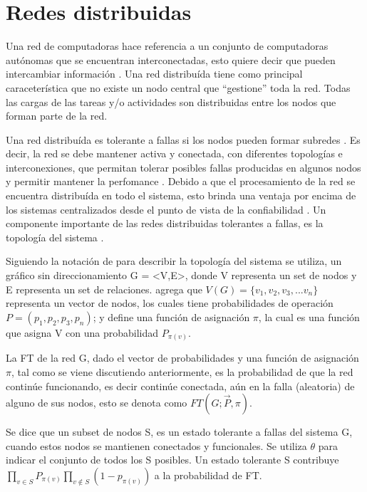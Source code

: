 \section{Redes distribuidas}
Una red de computadoras hace referencia a un conjunto de computadoras autónomas que se encuentran interconectadas, esto quiere decir que pueden intercambiar información \citep{Tanenbaum12}. Una red distribuída tiene como principal caraceterística que no existe un nodo central que ``gestione'' toda la red. Todas las cargas de las tareas y/o actividades son distribuidas entre los nodos que forman parte de la red.

Una red distribuída es tolerante a fallas si los nodos pueden formar subredes \citep{Stivaros92}. Es decir, la red se debe mantener activa y conectada, con diferentes topologías e interconexiones, que permitan tolerar posibles fallas producidas en algunos nodos y permitir mantener la perfomance \citep{Stivaros92}. Debido a que el procesamiento de la red se encuentra distribuída en todo el sistema, esto brinda una ventaja por encima de los sistemas centralizados desde el punto de vista de la confiabilidad \citep{Pradhan82}. Un componente importante de las redes distribuidas tolerantes a fallas, es la topología del sistema \citep{Pradhan82}.

Siguiendo la notación de \cite{Pradhan82} para describir la topología del sistema se utiliza, un gráfico sin direccionamiento G = <V,E>, donde V representa un set de nodos y E representa un set de relaciones. \cite{Stivaros92} agrega que $V(G) = \{v_1,v_2,v_3, ... v_n \}$ representa un vector de nodos, los cuales tiene probabilidades de operación $P = (p_1, p_2, p_3, p_n)$; y define una función de asignación $\pi$, la cual es una función que asigna V con una probabilidad $P_{\pi(v)}$.

La \ac{FT} de la red G, dado el vector de probabilidades  y una función de asignación $\pi$, tal como se viene discutiendo anteriormente, es la probabilidad de que la red continúe funcionando, es decir continúe conectada, aún en la falla (aleatoria) de alguno de sus nodos, esto se denota  como $FT(G;\vec{P},\pi)$.

Se dice que un subset de nodos S, es un estado tolerante a fallas del sistema G, cuando estos nodos se mantienen conectados y funcionales. Se utiliza $\theta$ para indicar el conjunto de todos los S posibles. Un estado tolerante S contribuye $\prod_{v\in S}{P_{\pi (v)}} \prod_{v \notin S} (1-p_{\pi (v)})$ a la probabilidad de \ac{FT}.

